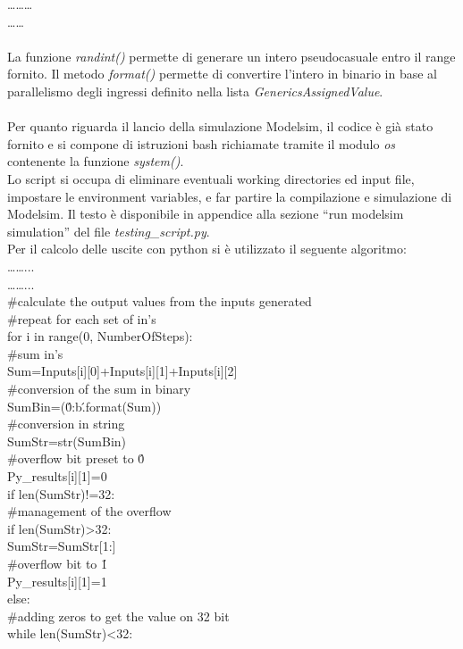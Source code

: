 \begin{itemize}
………\\
……\\
\\
La funzione \textit{randint()} permette di generare un intero pseudocasuale entro il range fornito.
Il metodo \textit{format()} permette di convertire l’intero in binario in base al parallelismo degli ingressi definito nella lista \textit{GenericsAssignedValue}.\\
\\
Per quanto riguarda il lancio della simulazione Modelsim, il codice è già stato fornito e si compone di istruzioni bash richiamate tramite il modulo \textit{os} contenente la funzione \textit{system()}.
\\
Lo script si occupa di eliminare eventuali working directories ed input file, impostare le environment variables, e far partire la compilazione e simulazione di Modelsim.
Il testo è disponibile in appendice alla sezione “run modelsim simulation” del file \textit{testing\_script.py}.
\\
Per il calcolo delle uscite con python si è utilizzato il seguente algoritmo:\\
……...\\
……...\\
\#calculate the output values from the inputs generated\\
\#repeat for each set of in's\\
for i in range(0, NumberOfSteps):\\  
\#sum in's\\
Sum=Inputs[i][0]+Inputs[i][1]+Inputs[i][2]\\
\#conversion of the sum in binary\\
SumBin=(\'{0:b}\'.format(Sum))\\
\#conversion in string \\
SumStr=str(SumBin)\\
\#overflow bit preset to \'0\'\\
Py\_results[i][1]=0 \\
if len(SumStr)!=32:\\
\#management of the overflow\\
if len(SumStr)>32:    \\
SumStr=SumStr[1:]\\
\#overflow bit to \'1\'\\
Py\_results[i][1]=1\\
else:\\
\#adding zeros to get the value on 32 bit\\
while len(SumStr)<32:  \\

\end{itemize}
